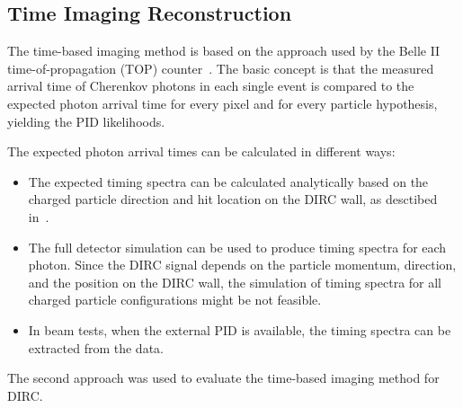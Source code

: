 \subsection{Time Imaging Reconstruction}
\label{sec:ti}

The time-based imaging method is based on the approach used by the Belle II time-of-propagation (TOP) counter~\cite{staric2}. The basic concept is that the measured arrival time of Cherenkov photons in each single event is compared to the expected photon arrival time for every pixel and for every particle hypothesis, yielding the PID likelihoods.

The expected photon arrival times can be calculated in different ways:
\begin{itemize}
\item The expected timing spectra can be calculated analytically based on the charged particle direction and hit location on the DIRC wall, as desctibed in~\cite{staric2, staric3}.
\item The full detector simulation can be used to produce timing spectra for each photon. Since the DIRC signal depends on the particle momentum, direction, and the position on the DIRC wall, the simulation of timing spectra for all charged particle configurations might be not feasible.
\item In beam tests, when the external PID is available, the timing spectra can be extracted from the data.
\end{itemize}

The second approach was used to evaluate the time-based imaging method for \gluex DIRC.


